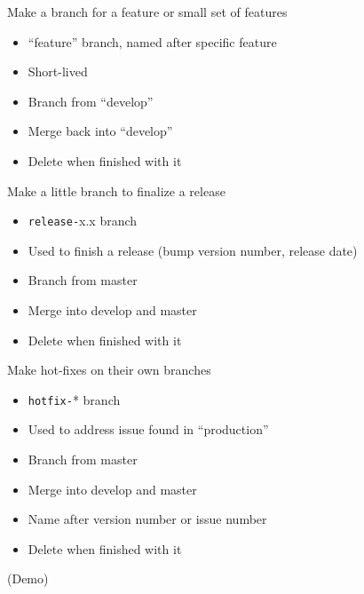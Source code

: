 \documentclass{beamer}
\begin{document}
\begin{frame}[plain]

  Make a branch for a feature or small set of features

  \begin{itemize}
  \item ``feature'' branch, named after specific feature
  \item Short-lived
  \item Branch from ``develop''
  \item Merge back into ``develop''
  \item Delete when finished with it
  \end{itemize}

\end{frame}


\begin{frame}[plain]

  Make a little branch to finalize a release

  \begin{itemize}
  \item {\tt release-}x.x branch
  \item Used to finish a release (bump version number, release date)
  \item Branch from master
  \item Merge into develop and master
  \item Delete when finished with it
  \end{itemize}

\end{frame}

\begin{frame}[plain]

  Make hot-fixes on their own branches

  \begin{itemize}
  \item {\tt hotfix-}* branch
  \item Used to address issue found in ``production''
  \item Branch from master
  \item Merge into develop and master
  \item Name after version number or issue number
  \item Delete when finished with it
  \end{itemize}

\end{frame}

\begin{frame}[plain]
  \begin{center}
  (Demo)    
  \end{center}

\end{frame}
\end{document}
